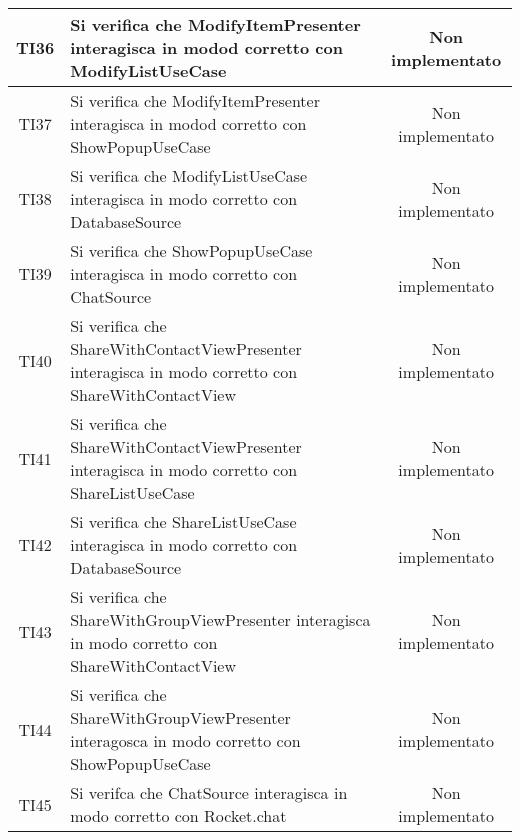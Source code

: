 \begin{center}
\begin{longtable}{|c|>{\centering}m{10cm}|c|}
		TI36 & Si verifica che ModifyItemPresenter interagisca in modod corretto con ModifyListUseCase & Non implementato \\ \hline
		TI37 & Si verifica che ModifyItemPresenter interagisca in modod corretto con ShowPopupUseCase & Non implementato \\ \hline
		TI38 & Si verifica che ModifyListUseCase interagisca in modo corretto con DatabaseSource & Non implementato \\ \hline
		TI39 & Si verifica che ShowPopupUseCase interagisca in modo corretto con ChatSource & Non implementato \\ \hline
		TI40 & Si verifica che ShareWithContactViewPresenter interagisca in modo corretto con ShareWithContactView & Non implementato \\ \hline
		TI41 & Si verifica che ShareWithContactViewPresenter interagisca in modo corretto con ShareListUseCase & Non implementato \\ \hline
		TI42 & Si verifica che ShareListUseCase interagisca in modo corretto con DatabaseSource & Non implementato \\ \hline
		TI43 & Si verifica che ShareWithGroupViewPresenter interagisca in modo corretto con ShareWithContactView & Non implementato \\ \hline
		TI44 & Si verifica che ShareWithGroupViewPresenter interagosca in modo corretto con ShowPopupUseCase & Non implementato \\ \hline
		TI45 & Si verifca che ChatSource interagisca in modo corretto con Rocket.chat & Non implementato \\ \hline
	\end{longtable}
\end{center}

